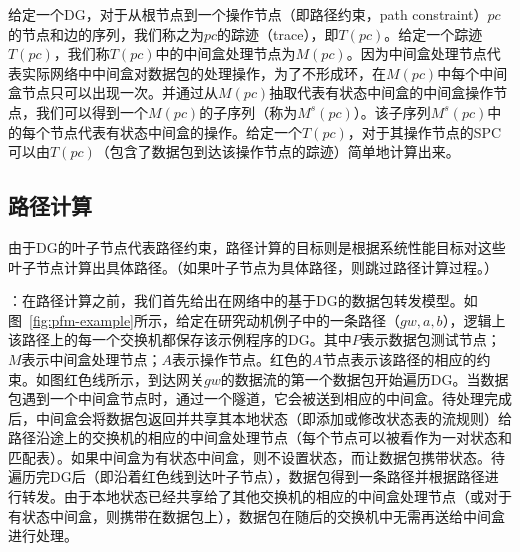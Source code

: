 \documentclass{ctexart}
\newcommand{\para}[1]{\noindent {\bf #1}}%
\begin{document}
给定一个DG，对于从根节点到一个操作节点（即路径约束，path constraint）$pc$的节点和边的序列，我们称之为$pc$的踪迹（trace），即$T(pc)$。给定一个踪迹$T(pc)$，我们称$T(pc)$中的中间盒处理节点为$M(pc)$。因为中间盒处理节点代表实际网络中中间盒对数据包的处理操作，为了不形成环，在$M(pc)$中每个中间盒节点只可以出现一次。并通过从$M(pc)$抽取代表有状态中间盒的中间盒操作节点，我们可以得到一个$M(pc)$的子序列（称为$M^s(pc)$）。该子序列$M^s(pc)$中的每个节点代表有状态中间盒的操作。给定一个$T(pc)$，对于其操作节点的SPC可以由$T(pc)$（包含了数据包到达该操作节点的踪迹）简单地计算出来。


\subsection{路径计算}

由于DG的叶子节点代表路径约束，路径计算的目标则是根据系统性能目标对这些叶子节点计算出具体路径。（如果叶子节点为具体路径，则跳过路径计算过程。）


\para{数据包转发模型}：在路径计算之前，我们首先给出在网络中的基于DG的数据包转发模型。如图~\ref{fig:pfm-example}所示，给定在研究动机例子中的一条路径（$gw, a, b$），逻辑上该路径上的每一个交换机都保存该示例程序的DG。其中$P$表示数据包测试节点；$M$表示中间盒处理节点；$A$表示操作节点。红色的$A$节点表示该路径的相应的约束。如图红色线所示，到达网关$gw$的数据流的第一个数据包开始遍历DG。当数据包遇到一个中间盒节点时，通过一个隧道，它会被送到相应的中间盒。待处理完成后，中间盒会将数据包返回并共享其本地状态（即添加或修改状态表的流规则）给路径沿途上的交换机的相应的中间盒处理节点（每个节点可以被看作为一对状态和匹配表）。如果中间盒为有状态中间盒，则不设置状态，而让数据包携带状态。待遍历完DG后（即沿着红色线到达叶子节点），数据包得到一条路径并根据路径进行转发。由于本地状态已经共享给了其他交换机的相应的中间盒处理节点（或对于有状态中间盒，则携带在数据包上），数据包在随后的交换机中无需再送给中间盒进行处理。
\end{document}
